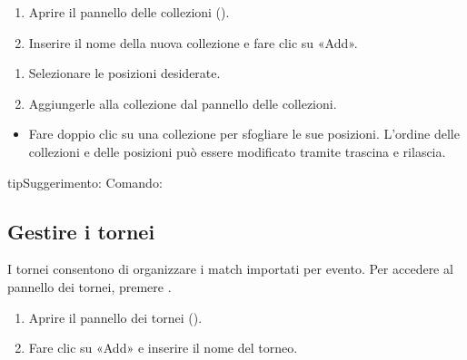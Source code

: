 \documentclass[letterpaper,10pt,italian]{sphinxmanual}
\begin{document}
\sphinxAtStartPar
{}
\begin{enumerate}
%
\item {} 
\sphinxAtStartPar
Aprire il pannello delle collezioni ().

\item {} 
\sphinxAtStartPar
Inserire il nome della nuova collezione e fare clic su «Add».

\end{enumerate}

\sphinxAtStartPar
{}
\begin{enumerate}
%
\item {} 
\sphinxAtStartPar
Selezionare le posizioni desiderate.

\item {} 
\sphinxAtStartPar
Aggiungerle alla collezione dal pannello delle collezioni.

\end{enumerate}

\sphinxAtStartPar
{}
\begin{itemize}
\item {} 
\sphinxAtStartPar
Fare doppio clic su una collezione per sfogliare le sue posizioni. L’ordine delle collezioni e delle posizioni può essere modificato tramite trascina e rilascia.

\end{itemize}

\begin{sphinxadmonition}{tip}{Suggerimento:}
\sphinxAtStartPar
Comando: 
\end{sphinxadmonition}


\subsection{Gestire i tornei}
\label{\detokenize{guide_utilisateur:gerer-les-tournois}}
\sphinxAtStartPar
I tornei consentono di organizzare i match importati per evento. Per accedere al pannello dei tornei, premere .

\sphinxAtStartPar
{}
\begin{enumerate}
%
\item {} 
\sphinxAtStartPar
Aprire il pannello dei tornei ().

\item {} 
\sphinxAtStartPar
Fare clic su «Add» e inserire il nome del torneo.

\end{enumerate}
\end{document}

